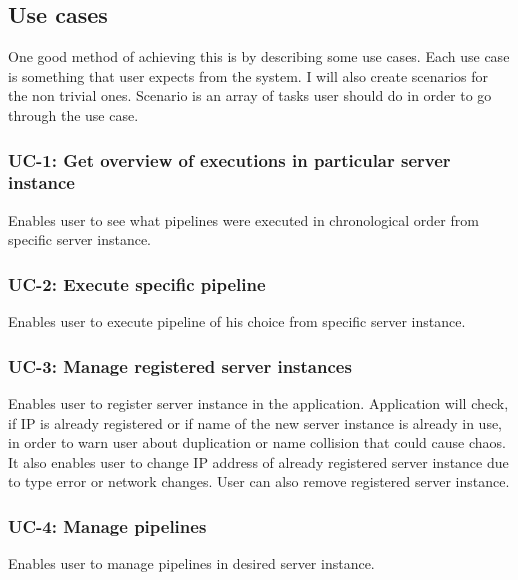 \subsection{Use cases}
One good method of achieving this is by describing some use cases. Each use case is something that user expects from the system. I will also create scenarios for the non trivial ones. Scenario is an array of tasks user should do in order to go through the use case.

\subsubsection*{UC-1: Get overview of executions in particular server instance}
Enables user to see what pipelines were executed in chronological order from specific server instance.
\subsubsection*{UC-2: Execute specific pipeline}
Enables user to execute pipeline of his choice from specific server instance.
\subsubsection*{UC-3: Manage registered server instances}
Enables user to register server instance in the application. Application will check, if IP is already registered or if name of the new server instance is already in use, in order to warn user about duplication or name collision that could cause chaos. It also enables user to change IP address of already registered server instance due to type error or network changes. User can also remove registered server instance.
\subsubsection*{UC-4: Manage pipelines}
Enables user to manage pipelines in desired server instance.
